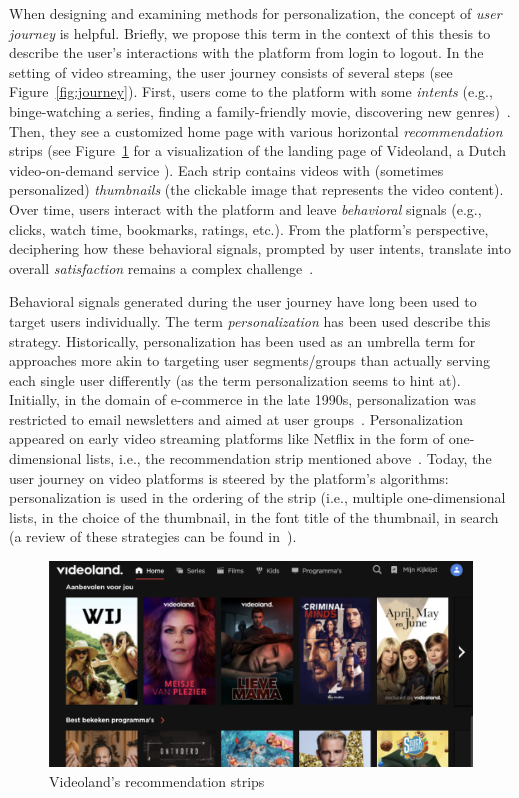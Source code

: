 When designing and examining methods for personalization, the concept of \emph{user journey} is helpful. 
Briefly, we propose this term in the context of this thesis to describe the user's interactions with the platform from login to logout.
In the setting of video streaming, the user journey consists of several steps (see Figure~\ref{fig:journey}).
First, users come to the platform with some \emph{intents} (e.g., binge-watching a series, finding a family-friendly movie, discovering new genres)~\cite{intent}. 
Then, they see a customized home page with various horizontal \emph{recommendation} strips (see Figure~\ref{fig:VLStrip} for a visualization of the landing page of Videoland, a Dutch video-on-demand service ). 
Each strip contains videos with (sometimes personalized) \emph{thumbnails} (the clickable image that represents the video content). 
Over time, users interact with the platform and leave \emph{behavioral} signals (e.g., clicks, watch time, bookmarks, ratings, etc.). 
From the platform's perspective, deciphering how these behavioral signals, prompted by user intents, translate into overall \emph{satisfaction} remains a complex challenge~\cite{spotifyIntent}.

Behavioral signals generated during the user journey have long been used to target users individually. 
The term \emph{personalization} has been used describe this strategy. 
Historically, personalization has been used as an umbrella term for approaches more akin to targeting user segments/groups than actually serving each single user differently (as the term personalization seems to hint at). 
Initially, in the domain of e-commerce in the late 1990s, personalization was restricted to email newsletters and aimed at user groups~\cite{oldReco}. 
Personalization appeared on early video streaming platforms like Netflix in the form of one-dimensional lists, i.e.,  the recommendation strip mentioned above~\cite{oldReco}. 
Today, the user journey on video platforms is steered by the platform's algorithms: personalization is used in the ordering of the strip (i.e., multiple one-dimensional lists, in the choice of the thumbnail, in the font title of the thumbnail, in search (a review of these strategies can be found in~\cite{NetflixReco}).

\begin{figure}[h]
  \centering
  \includegraphics[width=\textwidth]{images/VLHome_cropped.png}
  \caption{Videoland's recommendation strips}
  \label{fig:VLStrip}
\end{figure}


